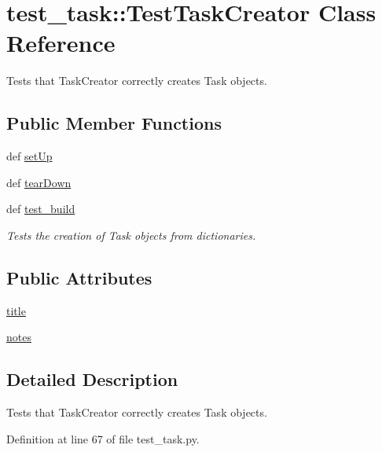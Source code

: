 \hypertarget{classtest__task_1_1TestTaskCreator}{
\section{test\-\_\-task\-:\-:\-Test\-Task\-Creator \-Class \-Reference}
\label{classtest__task_1_1TestTaskCreator}
}


\-Tests that \-Task\-Creator correctly creates \-Task objects.  


\subsection*{\-Public \-Member \-Functions}
\begin{DoxyCompactItemize}
\item 
def \hyperlink{classtest__task_1_1TestTaskCreator_a0b41be61221b7743f0fe9409bbd6faa1}{set\-Up}
\item 
def \hyperlink{classtest__task_1_1TestTaskCreator_ad0631b0369f42fc62d0e179b8c4624f2}{tear\-Down}
\item 
def \hyperlink{classtest__task_1_1TestTaskCreator_a00711f8f04ce7365e4a6586a74cd4546}{test\-\_\-build}
\begin{DoxyCompactList}\small\item\em \-Tests the creation of \-Task objects from dictionaries. \end{DoxyCompactList}\end{DoxyCompactItemize}
\subsection*{\-Public \-Attributes}
\begin{DoxyCompactItemize}
\item 
\hyperlink{classtest__task_1_1TestTaskCreator_a9c55dbe4857c75991a7ad6dd649e6f73}{title}
\item 
\hyperlink{classtest__task_1_1TestTaskCreator_aafdbd8cf36b40657079ce5f73804982c}{notes}
\end{DoxyCompactItemize}


\subsection{\-Detailed \-Description}
\-Tests that \-Task\-Creator correctly creates \-Task objects. 

\-Definition at line 67 of file test\-\_\-task.\-py.



